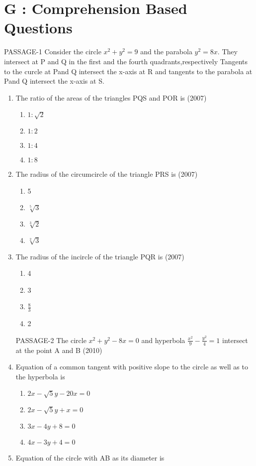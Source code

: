 \documentclass[12pt]{article}
\begin{document}
\section*{G  :  Comprehension Based Questions}

PASSAGE-1
 Consider the circle $x^2+y^2=9$ and the parabola $y^2=8x$. They intersect at P and Q in the first and the fourth quadrants,respectively Tangents to the curcle at Pand Q intersect the x-axis at R and tangents to the parabola at Pand Q intersect the x-axis at S.
\begin{enumerate}
\item The ratio of the areas of the triangles PQS and POR is (2007)
\begin{enumerate}
\item $1:\sqrt{2}$
\item $1:2$
\item $1:4$
\item $1:8$
\end{enumerate}
\item The radius of the circumcircle of the triangle PRS is  (2007)
\begin{enumerate}
\item 5
\item $\sqrt[5]{3}$
\item $\sqrt[3]{2}$
\item $\sqrt[2]{3}$
\end{enumerate}
\item The radius of the incircle of the triangle PQR is (2007)
\begin{enumerate}
\item 4
\item 3
\item $\frac{8}{3}$
\item 2
\end{enumerate}
PASSAGE-2
The circle $x^2+y^2-8x=0$ and hyperbola $\frac{x^2}{9}-\frac{y^2}{4}=1$ intersect at
the point A and B (2010)
\item Equation of a common tangent with positive slope to the circle as well as to the hyperbola is 
\begin{enumerate}
\item $2x-\sqrt{5}y-20x=0$
\item $2x-\sqrt{5}y+x=0$
\item $3x-4y+8=0$
\item $4x-3y+4=0$
\end{enumerate}
\item Equation of the circle with AB as its diameter is 

\end{enumerate}
\end{document}
